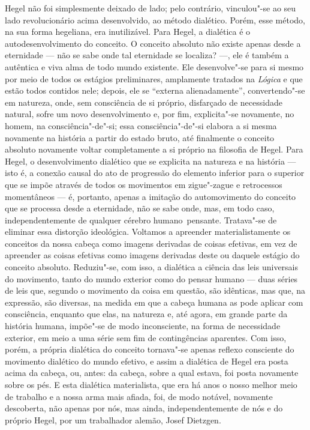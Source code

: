 Hegel não
foi simplesmente deixado de lado; pelo contrário, vinculou"-se ao seu
lado revolucionário acima desenvolvido, ao método dialético. Porém, esse
método, na sua forma hegeliana, era inutilizável.
Para Hegel,
a dialética é o autodesenvolvimento do conceito. O conceito absoluto não
existe apenas desde a eternidade --- não se sabe onde tal eternidade se localiza? ---, ele é também a
autêntica e viva alma de todo mundo existente. Ele desenvolve"-se para si
mesmo por meio de todos os estágios preliminares, amplamente tratados na
\emph{Lógica} e que estão todos contidos nele; depois, ele se ``externa
alienadamente'', convertendo"-se em natureza, onde, sem consciência de si
próprio, disfarçado de necessidade natural, sofre um novo
desenvolvimento e, por fim, explicita"-se novamente, no homem, na
consciência"-de"-si; essa consciência"-de"-si elabora a si mesma
novamente na história a partir do estado bruto, até
finalmente o conceito absoluto novamente voltar completamente a si
próprio na filosofia
de Hegel.
Para Hegel,
o desenvolvimento dialético que se explicita na natureza e na história ---
isto é, a conexão causal do ato de progressão do elemento inferior para
o superior que se impõe através de todos os movimentos em zigue"-zague e
retrocessos momentâneos --- é, portanto, apenas a imitação 
do automovimento do conceito que se processa desde a
eternidade, não se sabe onde, mas, em todo caso, independentemente de
qualquer cérebro humano\est\ pensante. Tratava"-se de eliminar essa distorção
ideológica. Voltamos a apreender materialistamente os conceitos da nossa
cabeça como imagens derivadas de coisas efetivas, em 
vez de apreender as coisas efetivas como imagens derivadas
deste ou daquele estágio do conceito absoluto. 
Reduziu"-se, com isso, a dialética a ciência das leis universais do
movimento, tanto do mundo exterior como do pensar humano --- duas séries
de leis que, segundo o movimento da coisa em questão, são
idênticas, mas que, na expressão, são diversas, na medida em que a
cabeça humana as pode aplicar com consciência, enquanto que elas, na
natureza e, até agora, em grande parte da história humana,
impõe"-se de modo inconsciente, na forma de necessidade exterior, em meio
a uma série sem fim de contingências aparentes. Com isso, porém, a
própria dialética do conceito tornava"-se apenas reflexo consciente do
movimento dialético do mundo efetivo, e assim a dialética
de Hegel era
posta acima da cabeça, ou, antes: da 
cabeça, sobre a qual estava, foi posta novamente sobre os pés. E esta
dialética materialista, que era há anos o nosso melhor meio de trabalho
e a nossa arma mais afiada, foi, de modo notável, novamente descoberta,
não apenas por nós, mas ainda, independentemente de nós e do próprio
Hegel,
por um trabalhador
alemão, Josef Dietzgen.

